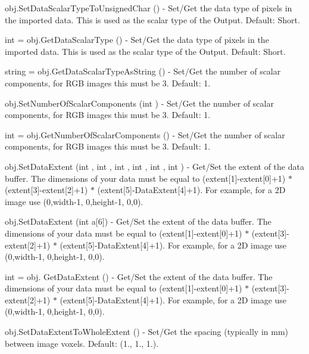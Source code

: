 \begin{DoxyItemize}
\item {\ttfamily obj.\-Set\-Data\-Scalar\-Type\-To\-Unsigned\-Char ()} -\/ Set/\-Get the data type of pixels in the imported data. This is used as the scalar type of the Output. Default\-: Short.  
\item {\ttfamily int = obj.\-Get\-Data\-Scalar\-Type ()} -\/ Set/\-Get the data type of pixels in the imported data. This is used as the scalar type of the Output. Default\-: Short.  
\item {\ttfamily string = obj.\-Get\-Data\-Scalar\-Type\-As\-String ()} -\/ Set/\-Get the number of scalar components, for R\-G\-B images this must be 3. Default\-: 1.  
\item {\ttfamily obj.\-Set\-Number\-Of\-Scalar\-Components (int )} -\/ Set/\-Get the number of scalar components, for R\-G\-B images this must be 3. Default\-: 1.  
\item {\ttfamily int = obj.\-Get\-Number\-Of\-Scalar\-Components ()} -\/ Set/\-Get the number of scalar components, for R\-G\-B images this must be 3. Default\-: 1.  
\item {\ttfamily obj.\-Set\-Data\-Extent (int , int , int , int , int , int )} -\/ Get/\-Set the extent of the data buffer. The dimensions of your data must be equal to (extent\mbox{[}1\mbox{]}-\/extent\mbox{[}0\mbox{]}+1) $\ast$ (extent\mbox{[}3\mbox{]}-\/extent\mbox{[}2\mbox{]}+1) $\ast$ (extent\mbox{[}5\mbox{]}-\/\-Data\-Extent\mbox{[}4\mbox{]}+1). For example, for a 2\-D image use (0,width-\/1, 0,height-\/1, 0,0).  
\item {\ttfamily obj.\-Set\-Data\-Extent (int a\mbox{[}6\mbox{]})} -\/ Get/\-Set the extent of the data buffer. The dimensions of your data must be equal to (extent\mbox{[}1\mbox{]}-\/extent\mbox{[}0\mbox{]}+1) $\ast$ (extent\mbox{[}3\mbox{]}-\/extent\mbox{[}2\mbox{]}+1) $\ast$ (extent\mbox{[}5\mbox{]}-\/\-Data\-Extent\mbox{[}4\mbox{]}+1). For example, for a 2\-D image use (0,width-\/1, 0,height-\/1, 0,0).  
\item {\ttfamily int = obj. Get\-Data\-Extent ()} -\/ Get/\-Set the extent of the data buffer. The dimensions of your data must be equal to (extent\mbox{[}1\mbox{]}-\/extent\mbox{[}0\mbox{]}+1) $\ast$ (extent\mbox{[}3\mbox{]}-\/extent\mbox{[}2\mbox{]}+1) $\ast$ (extent\mbox{[}5\mbox{]}-\/\-Data\-Extent\mbox{[}4\mbox{]}+1). For example, for a 2\-D image use (0,width-\/1, 0,height-\/1, 0,0).  
\item {\ttfamily obj.\-Set\-Data\-Extent\-To\-Whole\-Extent ()} -\/ Set/\-Get the spacing (typically in mm) between image voxels. Default\-: (1., 1., 1.).  

\end{DoxyItemize}
